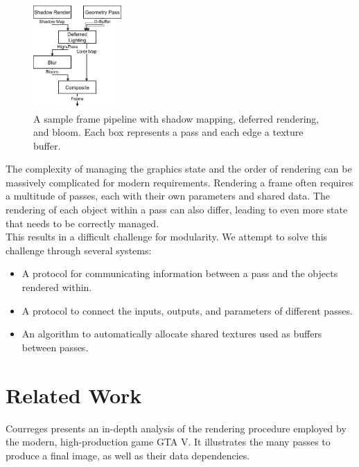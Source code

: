 \documentclass[format=sigconf]{acmart}
\begin{document}
\begin{figure}[h]
  \begin{center}
    \includegraphics[width=0.3\textwidth]{render-pipeline.png}
  \end{center}
  \caption{A sample frame pipeline with shadow mapping, deferred rendering, and bloom. Each box represents a pass and each edge a texture buffer.}
  \label{fig:render-pipeline}
\end{figure}

The complexity of managing the graphics state and the order of rendering can be massively complicated for modern requirements. Rendering a frame often requires a multitude of passes, each with their own parameters and shared data. The rendering of each object within a pass can also differ, leading to even more state that needs to be correctly managed. \\

This results in a difficult challenge for modularity. We attempt to solve this challenge through several systems:

\begin{itemize}
\item A protocol for communicating information between a pass and the objects rendered within.
\item A protocol to connect the inputs, outputs, and parameters of different passes.
\item An algorithm to automatically allocate shared textures used as buffers between passes.
\end{itemize}

\section{Related Work}\label{relatedwork}
Courreges\cite{gtav} presents an in-depth analysis of the rendering procedure employed by the modern, high-production game GTA V. It illustrates the many passes to produce a final image, as well as their data dependencies. \\
\end{document}

